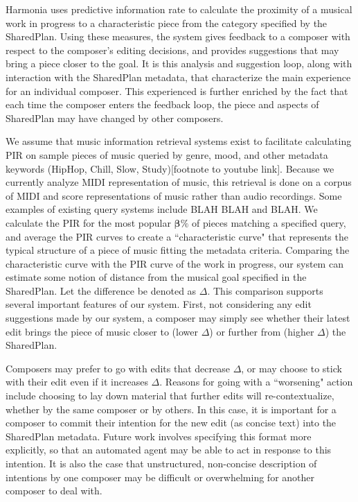 \documentclass[final,authoryear,5p,times,twocolumn]{elsarticle}
\begin{document}
Harmonia uses predictive information rate to calculate the proximity of a musical work in progress to a characteristic piece from the category specified by the SharedPlan. Using these measures, the system gives feedback to a composer with respect to the composer's editing decisions, and provides suggestions that may bring a piece closer to the goal. It is this analysis and suggestion loop, along with interaction with the SharedPlan metadata, that characterize the main experience for an individual composer. This experienced is further enriched by the fact that each time the composer enters the feedback loop, the piece and aspects of SharedPlan may have changed by other composers.

We assume that music information retrieval systems exist to facilitate calculating PIR on sample pieces of music queried by genre, mood, and other metadata keywords (HipHop, Chill, Slow, Study)[footnote to youtube link]. Because we currently analyze MIDI representation of music, this retrieval is done on a corpus of MIDI and score representations of music rather than audio recordings. Some examples of existing query systems include BLAH BLAH and BLAH. We calculate the PIR for the most popular $\boldsymbol{\beta}\%$ of pieces matching a specified query, and average the PIR curves to create a ``characteristic curve" that represents the typical structure of a piece of music fitting the metadata criteria. 
Comparing the characteristic curve with the PIR curve of the work in progress, our system can estimate some notion of distance from the musical goal specified in the SharedPlan. Let the difference be denoted as $\Delta$. This comparison supports several important features of our system. First, not considering any edit suggestions made by our system, a composer may simply see whether their latest edit brings the piece of music closer to (lower $\Delta$) or further from (higher $\Delta$) the SharedPlan.  

Composers may prefer to go with edits that decrease $\Delta$, or may choose to stick with their edit even if it increases $\Delta$. Reasons for going with a ``worsening" action include choosing to lay down material that further edits will re-contextualize, whether by the same composer or by others. In this case, it is important for a composer to commit their intention for the new edit (as concise text) into the SharedPlan metadata. Future work involves specifying this format more explicitly, so that an automated agent may be able to act in response to this intention. It is also the case that unstructured, non-concise description of intentions by one composer may be difficult or overwhelming for another composer to deal with.
\end{document}

